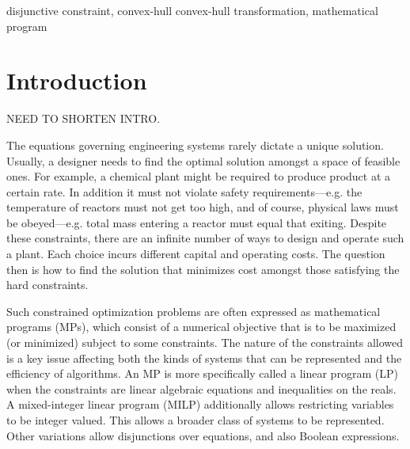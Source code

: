 \documentclass[preprint]{sigplanconf}%
\theoremstyle{remark}
\begin{document}
\terms disjunctive constraint, convex-hull
\keywords convex-hull transformation, mathematical program%


\section{Introduction}

NEED TO SHORTEN INTRO.

The equations governing engineering systems rarely dictate a unique solution.
Usually, a designer needs to find the optimal solution amongst a space of
feasible ones. For example, a chemical plant might be required to produce
product at a certain rate. In addition it must not violate safety
requirements---e.g. the temperature of reactors must not get too high, and of
course, physical laws must be obeyed---e.g. total mass entering a reactor must
equal that exiting. Despite these constraints, there are an infinite number of
ways to design and operate such a plant. Each choice incurs different capital
and operating costs. The question then is how to find the solution that
minimizes cost amongst those satisfying the hard constraints.

Such constrained optimization problems are often expressed as mathematical
programs (MPs), which consist of a numerical objective that is to be maximized
(or minimized) subject to some constraints. The nature of the constraints
allowed is a key issue affecting both the kinds of systems that can be
represented and the efficiency of algorithms. An MP is more specifically
called a linear program (LP) when the constraints are linear algebraic
equations and inequalities on the reals. A mixed-integer linear program (MILP)
additionally allows restricting variables to be integer valued. This allows a
broader class of systems to be represented. Other variations allow
disjunctions over equations, and also Boolean expressions.
\end{document}
